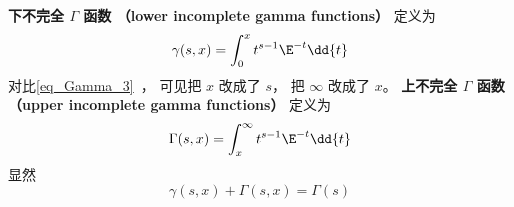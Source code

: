 
\begin{issues}
\issueDraft
\end{issues}


\textbf{下不完全 $\Gamma$ 函数 （lower incomplete gamma functions）} 定义为
\begin{equation}
\gamma(s, x) = \int_0^x t^{s-1}\E^{-t} \dd{t}
\end{equation}
对比\autoref{eq_Gamma_3}~， 可见把 $x$ 改成了 $s$， 把 $\infty$ 改成了 $x$。
\textbf{上不完全 $\Gamma$ 函数 （upper incomplete gamma functions）} 定义为
\begin{equation}
\Gamma(s, x) = \int_x^\infty t^{s-1}\E^{-t} \dd{t}
\end{equation}
显然
\begin{equation}
\gamma(s, x) + \Gamma(s, x) = \Gamma(s)
\end{equation}
